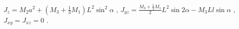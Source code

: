$J_z=M_2a^2+(M_3+\frac{1}{3}M_1)L^2\sin^2\alpha$ ,
$J_{yz}=\frac{M_3+\frac{1}{3}M_1}{2}L^2\sin2\alpha-M_3Ll\sin\alpha$ ,
$J_{xy}=J_{xz}=0$ .
 
